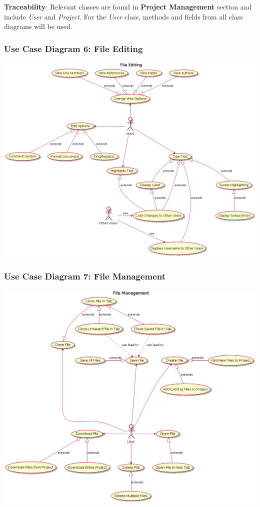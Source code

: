 \documentclass[twoside,letterpaper]{article}
\begin{document}
	\noindent \textbf{Traceability}:
	Relevant classes are found in \textbf{Project Management} section and include \textit{User} and \textit{Project}. For the \textit{User} class, methods and fields from all class diagrams will be used.
	
	\newpage
	
	\subsubsection[Use Case Diagram 6: File Editing]{\rmfamily\bfseries\color{black}
		Use Case Diagram 6: File Editing}
	
	\includegraphics[width=6.0in]{images/UseCaseDiagrams/FileEditing}
	
	\newpage
	
	\subsubsection[Use Case Diagram 7: File Management]{\rmfamily\bfseries\color{black}
		Use Case Diagram 7: File Management}
	\hypertarget{RefHeading22059017292}{}
	
	\includegraphics[width=6.0in]{images/UseCaseDiagrams/FileManagement}
	
\end{document}
